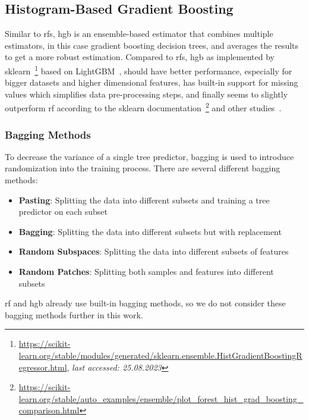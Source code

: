 \subsection{Histogram-Based Gradient Boosting}

Similar to \gls{rf}s, \gls{hgb} is an ensemble-based estimator that combines multiple estimators, in this case gradient boosting decision trees, and averages the results to get a more robust estimation. Compared to \gls{rf}s, \gls{hgb} as implemented by sklearn~\footnote{\url{https://scikit-learn.org/stable/modules/generated/sklearn.ensemble.HistGradientBoostingRegressor.html}, \textit{last accessed: 25.08.2023}} based on LightGBM~\cite{ke2017lightgbm}, should have better performance, especially for bigger datasets and higher dimensional features, has built-in support for missing values which simplifies data pre-processing steps, and finally seems to slightly outperform \gls{rf} according to the sklearn documentation~\footnote{\url{https://scikit-learn.org/stable/auto\_examples/ensemble/plot\_forest\_hist\_grad\_boosting\_comparison.html}} and other studies~\cite{apaydin2022evaluation}.

\subsubsection{Bagging Methods}

To decrease the variance of a single tree predictor, bagging is used to introduce randomization into the training process. There are several different bagging methods:

\begin{itemize}
    \item \textbf{Pasting}: Splitting the data into different subsets and training a tree predictor on each subset~\cite{breiman1999pasting}
    \item \textbf{Bagging}: Splitting the data into different subsets but with replacement~\cite{breiman1996bagging}
    \item \textbf{Random Subspaces}: Splitting the data into different subsets of features~\cite{ho1998random}
    \item \textbf{Random Patches}: Splitting both samples and features into different subsets~\cite{louppe2012ensembles}
\end{itemize}

\gls{rf} and \gls{hgb} already use built-in bagging methods, so we do not consider these bagging methods further in this work.

